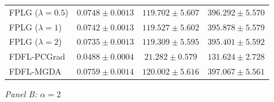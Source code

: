 \documentclass[ijoc,sglanonrev]{informs4}
\begin{document}
\begin{table}[htbp]
\begin{tabular}{l ccc}
FPLG ($\lambda\!=\!0.5$)                  & $0.0748 \pm 0.0013$ & $119.702 \pm 5.607$ & $396.292 \pm 5.570$ \\
FPLG ($\lambda\!=\!1$)                    & $0.0742 \pm 0.0013$ & $119.527 \pm 5.602$ & $395.878 \pm 5.579$ \\
FPLG ($\lambda\!=\!2$)                    & $0.0735 \pm 0.0013$ & $119.309 \pm 5.595$ & $395.401 \pm 5.592$ \\
\midrule
FDFL-PCGrad                               & $\mathbf{0.0488 \pm 0.0004}$ & $21.282 \pm 0.579$ & $131.624 \pm 2.728$ \\
FDFL-MGDA                                 & $0.0759 \pm 0.0014$ & $120.002 \pm 5.616$ & $397.067 \pm 5.561$ \\
\bottomrule
\end{tabular}

\bigskip
\textit{Panel B: $\alpha = 2$}


\end{table}
\end{document}
